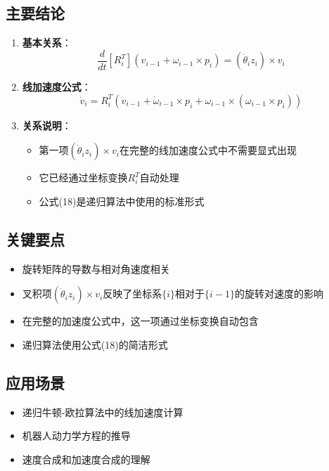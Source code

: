 \documentclass[12pt,a4paper]{article}
\begin{document}
\subsection{主要结论}

\begin{enumerate}
\item \textbf{基本关系}：
\begin{equation}
\frac{d}{dt}[R_i^T](v_{i-1} + \omega_{i-1} \times p_i) = (\dot{\theta}_i z_i) \times v_i
\end{equation}

\item \textbf{线加速度公式}：
\begin{equation}
\dot{v}_i = R_i^T (\dot{v}_{i-1} + \dot{\omega}_{i-1} \times p_i + \omega_{i-1} \times (\omega_{i-1} \times p_i))
\end{equation}

\item \textbf{关系说明}：
\begin{itemize}
\item 第一项$(\dot{\theta}_i z_i) \times v_i$在完整的线加速度公式中不需要显式出现
\item 它已经通过坐标变换$R_i^T$自动处理
\item 公式(18)是递归算法中使用的标准形式
\end{itemize}
\end{enumerate}

\subsection{关键要点}

\begin{itemize}
\item 旋转矩阵的导数与相对角速度相关
\item 叉积项$(\dot{\theta}_i z_i) \times v_i$反映了坐标系$\{i\}$相对于$\{i-1\}$的旋转对速度的影响
\item 在完整的加速度公式中，这一项通过坐标变换自动包含
\item 递归算法使用公式(18)的简洁形式
\end{itemize}

\subsection{应用场景}

\begin{itemize}
\item 递归牛顿-欧拉算法中的线加速度计算
\item 机器人动力学方程的推导
\item 速度合成和加速度合成的理解
\end{itemize}
\end{document}
